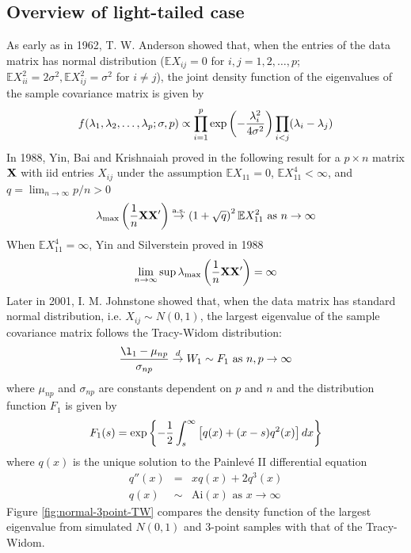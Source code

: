 \documentclass[11pt,reqno]{amsart}
\newcommand{\E}{\mathbb{E}}
\newcommand{\1}{\mathds{1}}
\newcommand{\0}{\boldsymbol{0}}
\newcommand{\M}{\text{max}}
\newcommand{\4}{\mathchoice{\mskip1.5mu}{\mskip1.5mu}{}{}}
\newcommand{\5}{\mathchoice{\mskip-1.5mu}{\mskip-1.5mu}{}{}}
\newcommand{\2}{\penalty250\mskip\thickmuskip\mskip-\thinmuskip} %
\newcommand{\as}{{\rm a.s.}}
\begin{document}
\subsection{Overview of light-tailed
  case}\label{sec:light_tail_review}
As early as in 1962, T. W. Anderson \cite{anderson:1963} showed that,
when the entries of the data matrix has normal distribution ($\E
X_{ij} = 0$ for $i,j = 1,2,\dots, p$; $\E X_{ii}^2 = 2\sigma^2, \E
X_{ij}^2 = \sigma^2$ for $i \neq j$), the joint density function
of the eigenvalues of the sample covariance matrix is given by
\[
f(\lambda_1, \lambda_2, \dots, \lambda_p; \sigma, p) \propto \prod_{i=1}^p \exp\left(
  -{\lambda_i^2 \over 4\sigma^2}
\right) \prod_{i < j} (\lambda_i - \lambda_j)
\]
In 1988, Yin, Bai and Krishnaiah proved in
\cite{yin:bai:Krishnaiah:1988} the following result for a $p \times n$
matrix $\bf X$ with iid entries $X_{ij}$ under the assumption $\E
X_{11} = 0$, $\E X_{11}^4 < \infty$, and $q = \lim_{n \to \infty} p/n
> 0$
\[
\lambda_{\M}\left({1 \over n}\bf{XX'}\right) \overset{\as}{\to} \left(
  1 + \sqrt{q}
\right)^2 \E X_{11}^2 \text{ as }n \to \infty
\]
When $\E X_{11}^4 = \infty$, Yin and Silverstein proved in 1988
\cite{yin:silverstein:1988}
\[
\lim_{n \to \infty} \sup \lambda_{\M}\left({1 \over
    n}\bf{XX'}\right) = \infty
\]
Later in 2001, I. M. Johnstone showed that, when the data matrix has
standard normal distribution, i.e. $X_{ij} \sim N(0, 1)$, the largest
eigenvalue of the sample covariance matrix follows the Tracy-Widom
distribution:
\[
{ł_1 - \mu_{np} \over \sigma_{np}} \overset{d}{\to} W_1 \sim F_1
\text{ as }{n, p \to \infty}
\]
where $\mu_{np}$ and $\sigma_{np}$ are constants dependent on $p$ and
$n$ and the distribution function $F_1$ is given by
\[
F_1(s) = \exp\left\{
  -{1 \over 2} \int_{s}^\infty \left[
    q(x) + (x - s) q^2(x)
  \right] dx
\right\}
\]
where $q(x)$ is the unique solution to the Painlev\'e II differential
equation
\begin{eqnarray*}
  q''(x) &=& xq(x) + 2 q^3(x) \\
  q(x) &\sim& \text{Ai}(x) \text{ as } x \to \infty
\end{eqnarray*}
Figure \ref{fig:normal-3point-TW} compares the density function of the largest
eigenvalue from simulated $N(0,1)$ and 3-point samples with
that of the Tracy-Widom.
\end{document}
